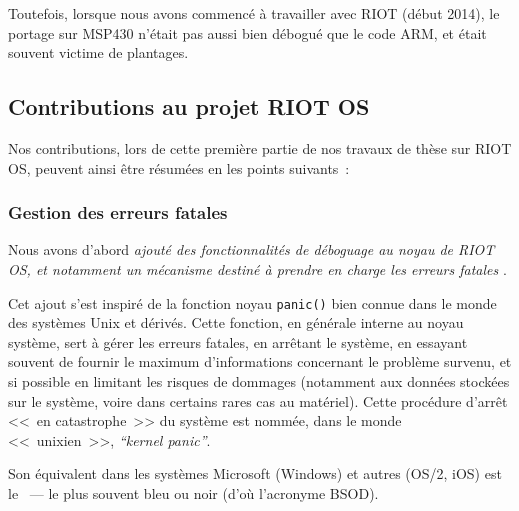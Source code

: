 Toutefois, lorsque nous avons commencé à travailler avec RIOT (début 2014),
le portage sur MSP430 n'était pas aussi bien débogué que le code ARM, et
était souvent victime de plantages.


\subsection{Contributions au projet RIOT OS}
\label{SubSecContribRIOT}

Nos contributions, lors de cette première partie de nos travaux de thèse
sur RIOT OS, peuvent ainsi être résumées en les points suivants~:

\subsubsection{Gestion des erreurs fatales}
\label{ParRIOTCorePanic}

Nous avons d'abord \emph{ajouté des fonctionnalités de déboguage
au noyau de RIOT OS, et notamment un mécanisme destiné à prendre en charge
les erreurs fatales} \cite{PRriotPanic}.

\smallskip

Cet ajout s'est inspiré de la fonction noyau \texttt{panic()} bien
connue dans le monde des systèmes Unix et dérivés. Cette fonction,
en générale interne au noyau système, sert à gérer les erreurs fatales,
en arrêtant le système, en essayant souvent de fournir le maximum
d'informations concernant le problème survenu, et si possible en
limitant les risques de dommages (notamment aux données stockées
sur le système, voire dans certains rares cas au matériel).
Cette procédure d'arrêt <<~en catastrophe~>> du système est nommée,
dans le monde <<~unixien~>>, \emph{``kernel panic''}.

Son équivalent dans les systèmes Microsoft (Windows) et autres
(OS/2, iOS) est le ~--- le plus souvent bleu
ou noir (d'où l'acronyme BSOD).

